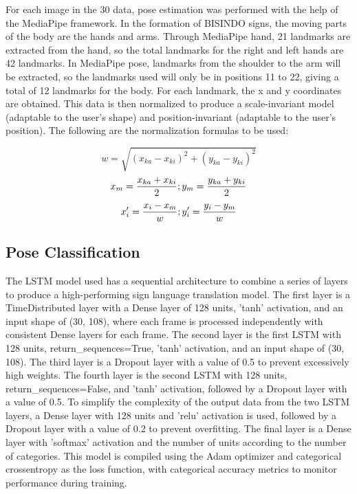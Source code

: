 For each image in the 30 data, pose estimation was performed with the help of the MediaPipe framework. In the formation of BISINDO signs, the moving parts of the body are the hands and arms. Through MediaPipe hand, 21 landmarks are extracted from the hand, so the total landmarks for the right and left hands are 42 landmarks. In MediaPipe pose, landmarks from the shoulder to the arm will be extracted, so the landmarks used will only be in positions 11 to 22, giving a total of 12 landmarks for the body. For each landmark, the x and y coordinates are obtained. This data is then normalized to produce a scale-invariant model (adaptable to the user's shape) and position-invariant (adaptable to the user's position). The following are the normalization formulas to be used:

\begin{equation}
  \label{eq:shouderWidthNorm}
  w = \sqrt{(x_{ka} - x_{ki})^2 + (y_{ka} - y_{ki})^2}
\end{equation}
\vspace{5mm}
\begin{equation}
  \label{eq:shoulderMidpointNorm}
  x_m = \frac{x_{ka} + x_{ki}}{2} ; \\
   y_m = \frac{y_{ka} + y_{ki}}{2}
\end{equation}
\vspace{5mm}
\begin{equation}
  \label{eq:normalization}
  x'_i = \frac{x_i - x_m}{w} ;  \\
   y'_i = \frac{y_i - y_m}{w}
\end{equation}

\subsection{Pose Classification}
\label{subsec:poseclassification}

The LSTM model used has a sequential architecture to combine a series of layers to produce a high-performing sign language translation model. The first layer is a TimeDistributed layer with a Dense layer of 128 units, 'tanh' activation, and an input shape of (30, 108), where each frame is processed independently with consistent Dense layers for each frame. The second layer is the first LSTM with 128 units, return\_sequences=True, 'tanh' activation, and an input shape of (30, 108). The third layer is a Dropout layer with a value of 0.5 to prevent excessively high weights. The fourth layer is the second LSTM with 128 units, return\_sequences=False, and 'tanh' activation, followed by a Dropout layer with a value of 0.5. To simplify the complexity of the output data from the two LSTM layers, a Dense layer with 128 units and 'relu' activation is used, followed by a Dropout layer with a value of 0.2 to prevent overfitting. The final layer is a Dense layer with 'softmax' activation and the number of units according to the number of categories. This model is compiled using the Adam optimizer and categorical crossentropy as the loss function, with categorical accuracy metrics to monitor performance during training.

